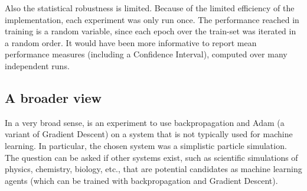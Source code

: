 Also the statistical robustness is limited. 
Because of the limited efficiency of the implementation, 
each experiment was only run once. 
The performance reached in training is a random variable, 
since each epoch over the train-set was iterated in a random order.
It would have been more informative to report mean performance measures (including a Confidence Interval), 
computed over many independent runs.

\subsection{A broader view}
In a very broad sense, \nenwin is an experiment to use backpropagation and Adam (a variant of Gradient Descent)
on a system that is not typically used for machine learning. 
In particular, the chosen system was a simplistic particle simulation. 
The question can be asked if other systems exist, 
such as scientific simulations of physics, chemistry, biology, etc., 
that are potential candidates as machine learning agents 
(which can be trained with backpropagation and Gradient Descent).